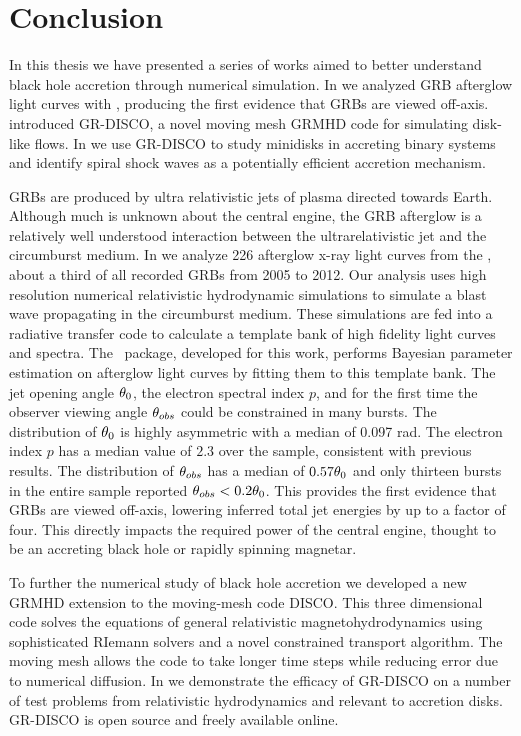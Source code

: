 \chapter*{Conclusion}

In this thesis we have presented a series of works aimed to better understand black hole accretion through numerical simulation.  In  we analyzed GRB afterglow light curves with \scalefit, producing the first evidence that GRBs are viewed off-axis.   introduced GR-DISCO, a novel moving mesh GRMHD code for simulating disk-like flows.  In  we use GR-DISCO to study minidisks in accreting binary systems and identify spiral shock waves as a potentially efficient accretion mechanism.

GRBs are produced by ultra relativistic jets of plasma directed towards Earth.  Although much is unknown about the central engine, the GRB afterglow is a relatively well understood interaction between the ultrarelativistic jet and the circumburst medium.  In  we analyze 226 afterglow x-ray light curves from the \swiftXRT, about a third of all recorded GRBs from 2005 to 2012.  Our analysis uses high resolution numerical relativistic hydrodynamic simulations to simulate a blast wave propagating in the circumburst medium.  These simulations are fed into a radiative transfer code to calculate a template bank of high fidelity light curves and spectra.  The \scalefit\ package, developed for this work, performs Bayesian parameter estimation on afterglow light curves by fitting them to this template bank.  The jet opening angle $\theta_0$, the electron spectral index $p$, and for the first time the observer viewing angle $\theta_{obs}$ could be constrained in many bursts.  The distribution of $\theta_0$ is highly asymmetric with a median of 0.097 rad. The electron index $p$ has a median value of $2.3$ over the sample, consistent with previous results.  The distribution of $\theta_{obs}$ has a median of $0.57 \theta_0$ and only thirteen bursts in the entire sample reported $\theta_{obs} < 0.2 \theta_0$.  This provides the first evidence that GRBs are viewed off-axis, lowering inferred total jet energies by up to a factor of four.  This directly impacts the required power of the central engine, thought to be an accreting black hole or rapidly spinning magnetar.

To further the numerical study of black hole accretion we developed a new GRMHD extension to the moving-mesh code DISCO.  This three dimensional code solves the equations of general relativistic magnetohydrodynamics using sophisticated RIemann solvers and a novel constrained transport algorithm.  The moving mesh allows the code to take longer time steps while reducing error due to numerical diffusion.  In  we demonstrate the efficacy of GR-DISCO on a number of test problems from relativistic hydrodynamics and relevant to accretion disks.  GR-DISCO is open source and freely available online.

